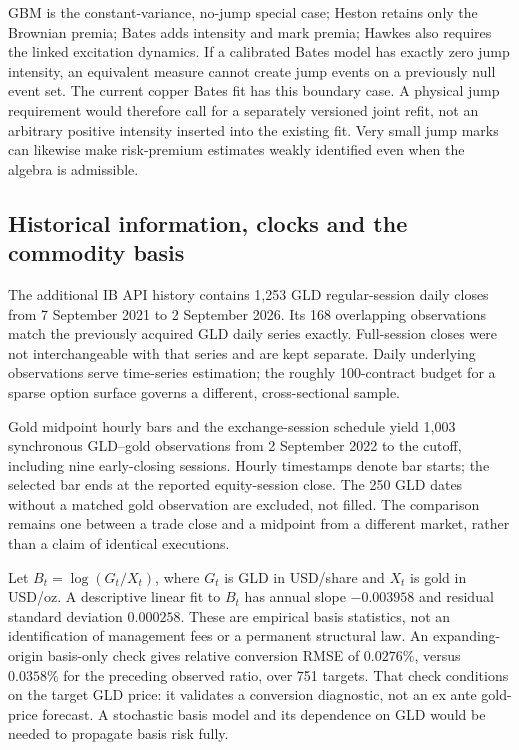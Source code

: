 GBM is the constant-variance, no-jump special case; Heston retains only the
Brownian premia; Bates adds intensity and mark premia; Hawkes also requires
the linked excitation dynamics. If a calibrated Bates model has exactly
zero jump intensity, an equivalent measure cannot create jump events on a
previously null event set. The current copper Bates fit has this boundary
case. A physical jump requirement would therefore call for a separately
versioned joint refit, not an arbitrary positive intensity inserted into the
existing fit. Very small jump marks can likewise make risk-premium estimates
weakly identified even when the algebra is admissible.

\subsection{Historical information, clocks and the commodity basis}

The additional IB API history contains 1,253 GLD regular-session daily closes
from 7 September 2021 to 2 September 2026. Its 168 overlapping observations
match the previously acquired GLD daily series exactly. Full-session closes were not
interchangeable with that series and are kept separate. Daily underlying
observations serve time-series estimation; the roughly 100-contract budget
for a sparse option surface governs a different, cross-sectional sample.

Gold midpoint hourly bars and the exchange-session schedule yield 1,003
synchronous GLD--gold observations from 2 September 2022 to the cutoff,
including nine early-closing sessions. Hourly timestamps denote bar starts;
the selected bar ends at the reported equity-session close. The 250 GLD
dates without a matched gold observation are excluded, not filled. The
comparison remains one between a trade close and a midpoint from a different
market, rather than a claim of identical executions.

Let $B_t=\log(G_t/X_t)$, where $G_t$ is GLD in USD/share and $X_t$ is gold in
USD/oz. A descriptive linear fit to $B_t$ has annual slope $-0.003958$ and
residual standard deviation $0.000258$. These are empirical basis statistics,
not an identification of management fees or a permanent structural law.
An expanding-origin basis-only check gives relative conversion RMSE of
$0.0276\%$, versus $0.0358\%$ for the preceding observed ratio, over 751
targets. That check conditions on the target GLD price: it validates a
conversion diagnostic, not an ex ante gold-price forecast. A stochastic basis
model and its dependence on GLD would be needed to propagate basis risk fully.

